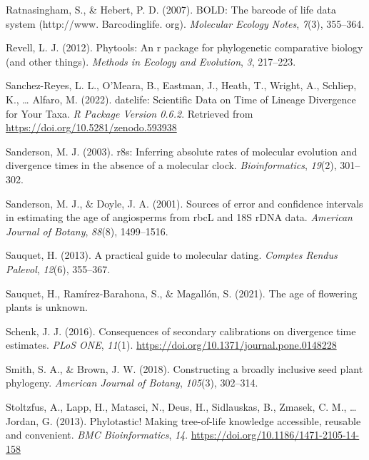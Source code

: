\documentclass[
  english,
  man]{apa6}
\newlength{\cslhangindent}
\newlength{\cslentryspacingunit} %
\newenvironment{CSLReferences}[2] %
 {%
  \setlength{\parindent}{0pt}
  \ifodd #1
  \let\oldpar\par
  \def\par{\hangindent=\cslhangindent\oldpar}
  \fi
  \setlength{\parskip}{#2\cslentryspacingunit}
 }%
 {}
\begin{document}
\begin{CSLReferences}{1}{0}
\leavevmode{}%
Ratnasingham, S., \& Hebert, P. D. (2007). BOLD: The barcode of life data system (http://www. Barcodinglife. org). \emph{Molecular Ecology Notes}, \emph{7}(3), 355--364.

\leavevmode{}%
Revell, L. J. (2012). Phytools: An r package for phylogenetic comparative biology (and other things). \emph{Methods in Ecology and Evolution}, \emph{3}, 217--223.

\leavevmode{}%
Sanchez-Reyes, L. L., O'Meara, B., Eastman, J., Heath, T., Wright, A., Schliep, K., \ldots{} Alfaro, M. (2022). {datelife: Scientific Data on Time of Lineage Divergence for Your Taxa}. \emph{R Package Version 0.6.2}. Retrieved from \url{https://doi.org/10.5281/zenodo.593938}

\leavevmode{}%
Sanderson, M. J. (2003). r8s: Inferring absolute rates of molecular evolution and divergence times in the absence of a molecular clock. \emph{Bioinformatics}, \emph{19}(2), 301--302.

\leavevmode{}%
Sanderson, M. J., \& Doyle, J. A. (2001). Sources of error and confidence intervals in estimating the age of angiosperms from rbcL and 18S rDNA data. \emph{American Journal of Botany}, \emph{88}(8), 1499--1516.

\leavevmode{}%
Sauquet, H. (2013). A practical guide to molecular dating. \emph{{Comptes Rendus Palevol}}, \emph{12}(6), 355--367.

\leavevmode{}%
Sauquet, H., Ramírez-Barahona, S., \& Magallón, S. (2021). The age of flowering plants is unknown.

\leavevmode{}%
Schenk, J. J. (2016). {Consequences of secondary calibrations on divergence time estimates}. \emph{PLoS ONE}, \emph{11}(1). \url{https://doi.org/10.1371/journal.pone.0148228}

\leavevmode{}%
Smith, S. A., \& Brown, J. W. (2018). Constructing a broadly inclusive seed plant phylogeny. \emph{American Journal of Botany}, \emph{105}(3), 302--314.

\leavevmode{}%
Stoltzfus, A., Lapp, H., Matasci, N., Deus, H., Sidlauskas, B., Zmasek, C. M., \ldots{} Jordan, G. (2013). {Phylotastic! Making tree-of-life knowledge accessible, reusable and convenient}. \emph{BMC Bioinformatics}, \emph{14}. \url{https://doi.org/10.1186/1471-2105-14-158}


\end{CSLReferences}
\end{document}
